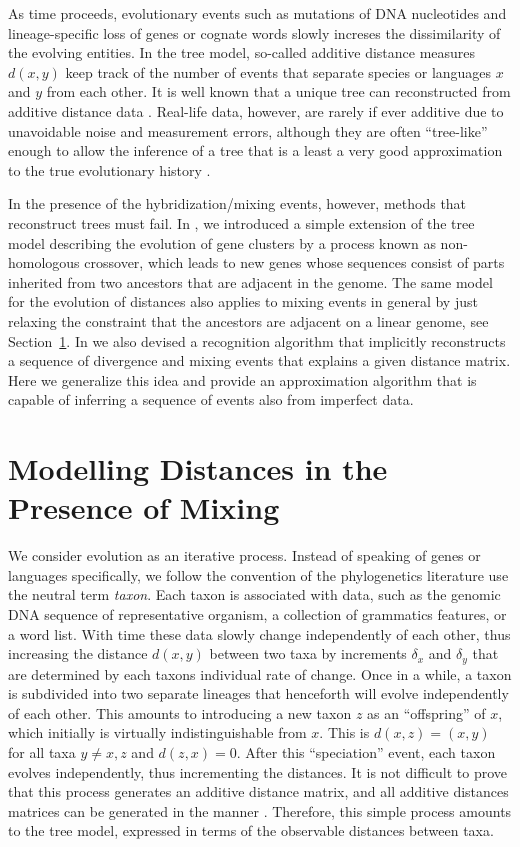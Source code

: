 \documentclass[amsmath]{lni}
\begin{document}
As time proceeds, evolutionary events such as mutations of DNA nucleotides
and lineage-specific loss of genes or cognate words slowly increses the
dissimilarity of the evolving entities. In the tree model, so-called
additive distance measures $d(x,y)$ keep track of the number of events that
separate species or languages $x$ and $y$ from each other.  It is well
known that a unique tree can reconstructed from additive distance data
\cite{SimoesPereira:69}. Real-life data, however, are rarely if ever
additive due to unavoidable noise and measurement errors, although they are
often ``tree-like'' enough to allow the inference of a tree that is a least
a very good approximation to the true evolutionary history
\cite{Atteson:99}.

In the presence of the hybridization/mixing events, however, methods that
reconstruct trees must fail. In \cite{Prohaska:18a}, we introduced a simple
extension of the tree model describing the evolution of gene clusters by a
process known as non-homologous crossover, which leads to new genes whose
sequences consist of parts inherited from two ancestors that are adjacent
in the genome. The same model for the evolution of distances also applies
to mixing events in general by just relaxing the constraint that the
ancestors are adjacent on a linear genome, see Section~\ref{sect:R}. In
\cite{Prohaska:18a} we also devised a recognition algorithm that implicitly
reconstructs a sequence of divergence and mixing events that explains a
given distance matrix. Here we generalize this idea and provide an
approximation algorithm that is capable of inferring a sequence of events
also from imperfect data.

\section{Modelling Distances in the Presence of Mixing} 
\label{sect:R}

We consider evolution as an iterative process. Instead of speaking of genes
or languages specifically, we follow the convention of the phylogenetics
literature use the neutral term \emph{taxon}. Each taxon is associated with
data, such as the genomic DNA sequence of representative organism, a
collection of grammatics features, or a word list. With time these data
slowly change independently of each other, thus increasing the distance
$d(x,y)$ between two taxa by increments $\delta_x$ and $\delta_y$ that are
determined by each taxons individual rate of change. Once in a while, a
taxon is subdivided into two separate lineages that henceforth will evolve
independently of each other. This amounts to introducing a new taxon $z$ as
an ``offspring'' of $x$, which initially is virtually indistinguishable
from $x$. This is $d(x,z)=(x,y)$ for all taxa $y\ne x,z$ and $d(z,x)=0$.
After this ``speciation'' event, each taxon evolves independently, thus
incrementing the distances. It is not difficult to prove that this process
generates an additive distance matrix, and all additive distances matrices
can be generated in the manner \cite{Prohaska:18a}. Therefore, this simple
process amounts to the tree model, expressed in terms of the observable
distances between taxa.
\end{document}
